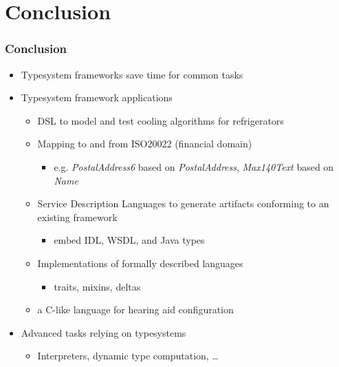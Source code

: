 \section{Conclusion}

\begin{frame}
  \frametitle{Conclusion}
  
  \begin{itemize}
    \item Typesystem frameworks save time for common tasks
    \item Typesystem framework applications
    \begin{itemize}
      \item DSL to model and test cooling algorithms for refrigerators 
      \item Mapping to and from ISO20022 (financial domain)
      \begin{itemize}
        \item e.g. \emph{PostalAddress6} based on \emph{PostalAddress},
        \emph{Max140Text} based on \emph{Name}
      \end{itemize}
      \item Service Description Languages to generate artifacts conforming
      to an existing framework
      \begin{itemize}
        \item embed IDL, WSDL, and Java types
      \end{itemize}
      \item Implementations of formally described languages
       \begin{itemize}
        \item traits, mixins, deltas
      \end{itemize}
      \item a C-like language for hearing aid configuration
    \end{itemize}
    \item Advanced tasks relying on typesystems
    \begin{itemize}
      \item Interpreters, dynamic type computation, \ldots
    \end{itemize}
  \end{itemize}
\end{frame}

